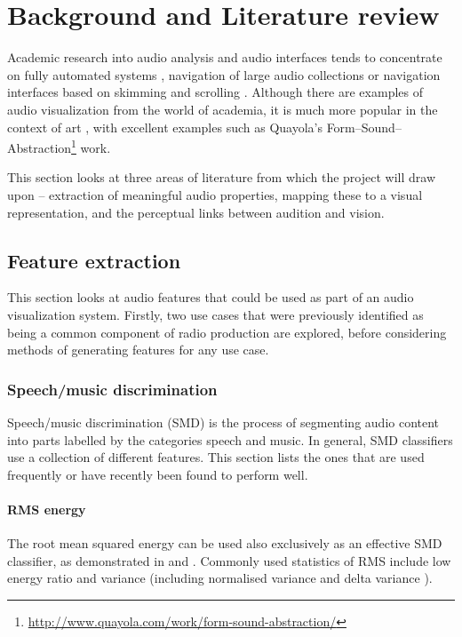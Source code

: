 \section{Background and Literature review}\label{sec:litreview}

Academic research into audio analysis and audio interfaces tends to concentrate
on fully automated systems \cite{AngueraMiro2012}, navigation of large audio
collections \cite{FontCorbera2010} or navigation interfaces based on skimming
\cite{Arons1997} and scrolling \cite{Lee2007}. Although there are examples of
audio visualization from the world of academia, it is much more popular in the
context of art \cite{Armitage2012}, with excellent examples such as Quayola's
Form--Sound--Abstraction\footnote{\url{http://www.quayola.com/work/form-sound-abstraction/}}
work.

This section looks at three areas of literature from which the project will
draw upon -- extraction of meaningful audio properties, mapping these to a
visual representation, and the perceptual links between audition and vision.

\subsection{Feature extraction}\label{sec:litreviewfeats}
This section looks at audio features that could be used as part of an audio
visualization system. Firstly, two use cases that were previously identified as
being a common component of radio production are explored, before considering
methods of generating features for any use case.

\subsubsection{Speech/music discrimination}
Speech/music discrimination (SMD) is the process of segmenting audio content
into parts labelled by the categories speech and music. In general, SMD
classifiers use a collection of different features. This section lists the ones
that are used frequently or have recently been found to perform well.

\paragraph{RMS energy}
The root mean squared energy can be used also exclusively as an effective SMD
classifier, as demonstrated in \cite{Ericsson2009} and \cite{Panagiotakis2005}.
Commonly used statistics of RMS include low energy ratio
\cite{Liang2005,Ericsson2009,Saunders1996,Scheirer1997} and variance
\cite{Ericsson2009} (including normalised variance \cite{Panagiotakis2005} and
delta variance \cite{Carey1999}).

